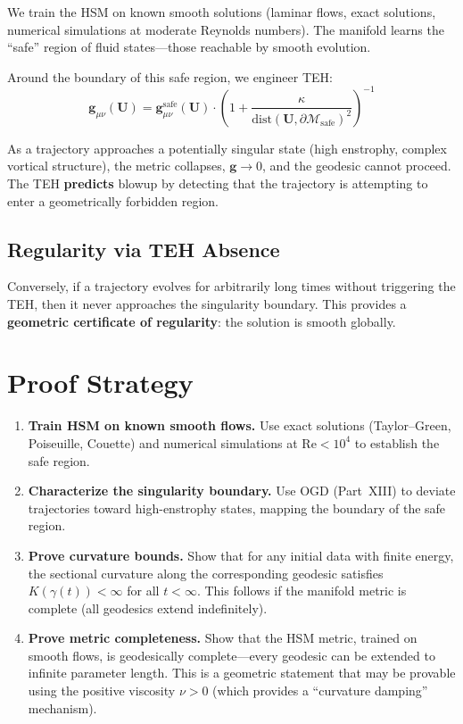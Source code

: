 \documentclass{article}
\begin{document}
We train the HSM on known smooth solutions (laminar flows, exact solutions,
numerical simulations at moderate Reynolds numbers).  The manifold learns
the ``safe'' region of fluid states---those reachable by smooth evolution.

Around the boundary of this safe region, we engineer TEH:
\begin{equation}
\mathbf{g}_{\mu\nu}(\mathbf{U}) = \mathbf{g}_{\mu\nu}^{\text{safe}}(\mathbf{U})
  \cdot \left(1 + \frac{\kappa}{\mathrm{dist}(\mathbf{U}, \partial
  \mathcal{M}_{\text{safe}})^2}\right)^{-1}
\end{equation}

As a trajectory approaches a potentially singular state (high enstrophy,
complex vortical structure), the metric collapses, $\mathbf{g} \to 0$, and
the geodesic cannot proceed.  The TEH \textbf{predicts} blowup by detecting
that the trajectory is attempting to enter a geometrically forbidden region.

\subsection{Regularity via TEH Absence}

Conversely, if a trajectory evolves for arbitrarily long times without
triggering the TEH, then it never approaches the singularity boundary.
This provides a \textbf{geometric certificate of regularity}: the solution
is smooth globally.

\section{Proof Strategy}
\label{sec:proof-strategy}

\begin{enumerate}
  \item \textbf{Train HSM on known smooth flows.}  Use exact solutions
    (Taylor--Green, Poiseuille, Couette) and numerical simulations at
    $\mathrm{Re} < 10^4$ to establish the safe region.
  \item \textbf{Characterize the singularity boundary.}  Use OGD
    (Part~XIII) to deviate trajectories toward high-enstrophy states,
    mapping the boundary of the safe region.
  \item \textbf{Prove curvature bounds.}  Show that for any initial data
    with finite energy, the sectional curvature along the corresponding
    geodesic satisfies $K(\gamma(t)) < \infty$ for all $t < \infty$.
    This follows if the manifold metric is complete (all geodesics extend
    indefinitely).
  \item \textbf{Prove metric completeness.}  Show that the HSM metric,
    trained on smooth flows, is geodesically complete---every geodesic
    can be extended to infinite parameter length.  This is a geometric
    statement that may be provable using the positive viscosity $\nu > 0$
    (which provides a ``curvature damping'' mechanism).
\end{enumerate}
\end{document}
